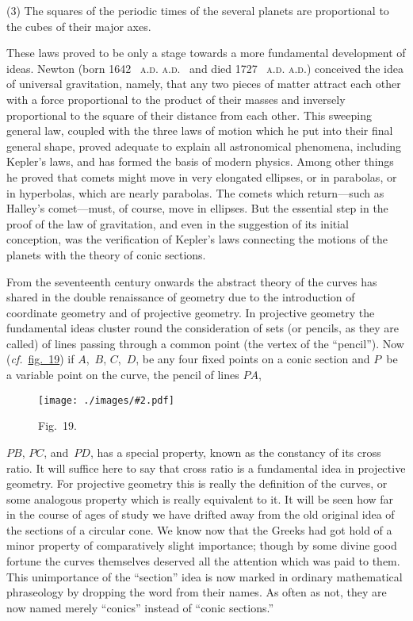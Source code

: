 \documentclass[12pt,leqno]{book}[2005/09/16]
\makeatletter
\newcommand{\Graphic}[2]{%
  \phantomsection\label{fig:#2}%
  \texttt{[image: ./images/\#2.pdf]}%
}
\newcommand{\DefWidth}{4in}%
\newcommand{\Figure}[2][\DefWidth]{%
  \begin{figure}[hbt!]
    \centering
    \phantomsection\label{fig:#2}
    \Graphic{#1}{fig#2}
    \caption{Fig.~#2.}
  \end{figure}\ignorespaces%
}
\newcommand{\Fig}[2][Fig.]{\hyperref[fig:#2]{#1~#2}}
\newcommand{\PageSep}[1]{\ignorespaces}
\newcommand{\cf}{\emph{cf.}}
\newcommand{\SCAbbrev}[3]{%
  \ifthenelse{\equal{#3}{.}}%
  {\textsc{\MakeLowercase{#1.#2}.}}%
  {\textsc{\MakeLowercase{#1.#2}.}\@#3}%
}
\newcommand{\AD}[1]{\SCAbbrev{A}{D}{#1}}
\makeatother
\begin{document}
(3) The squares of the periodic times of the
several planets are proportional to the cubes
of their major axes.
\PageSep{139}

These laws proved to be only a stage towards
a more fundamental development of
ideas. Newton (born 1642~\AD\ and died
%
1727~\AD) conceived the idea of universal
gravitation, namely, that any two pieces of
%
matter attract each other with a force proportional
to the product of their masses and
inversely proportional to the square of their
distance from each other. This sweeping
general law, coupled with the three laws of
motion which he put into their final general
shape, proved adequate to explain all astronomical
phenomena, including Kepler's laws,
and has formed the basis of modern physics.
Among other things he proved that comets
might move in very elongated ellipses, or in
parabolas, or in hyperbolas, which are nearly
parabolas. The comets which return---such
as Halley's comet---must, of course, move in
%
ellipses. But the essential step in the proof of
the law of gravitation, and even in the suggestion
of its initial conception, was the verification
of Kepler's laws connecting the
motions of the planets with the theory of
conic sections.

From the seventeenth century onwards the
abstract theory of the curves has shared in
the double renaissance of geometry due to
the introduction of coordinate geometry and
of projective geometry. In projective geometry
%
the fundamental ideas cluster round
\PageSep{140}
the consideration of sets (or pencils, as they
%
are called) of lines passing through a common
point (the vertex of the ``pencil''). Now
(\cf\ \Fig[fig.]{19}) if $A$,~$B$, $C$,~$D$, be any four fixed
points on a conic section and $P$~be a variable
point on the curve, the pencil of lines $PA$,
\Figure[2.5in]{19}
$PB$, $PC$, and~$PD$, has a special property,
known as the constancy of its cross ratio. It
%
will suffice here to say that cross ratio is a
fundamental idea in projective geometry.
For projective geometry this is really the definition
of the curves, or some analogous property
which is really equivalent to it. It
\PageSep{141}
will be seen how far in the course of ages of
study we have drifted away from the old
original idea of the sections of a circular cone.
We know now that the Greeks had got hold
of a minor property of comparatively slight
importance; though by some divine good
fortune the curves themselves deserved all
the attention which was paid to them. This
unimportance of the ``section'' idea is now
marked in ordinary mathematical phraseology
by dropping the word from their
names. As often as not, they are now
named merely ``conics'' instead of ``conic
sections.''
\end{document}
